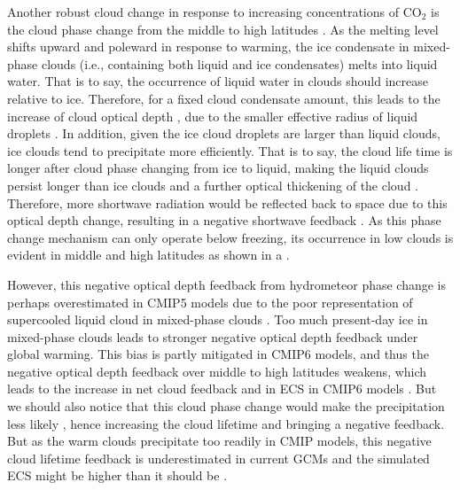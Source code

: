 Another robust cloud change in response to increasing concentrations of CO$_2$ is the cloud phase change from the middle to high latitudes \citep[e.g.,][]{Storelvmo2015cloud,Ceppi2016mechanisms,Tan2016observational,McCoy2016relationships}. As the melting level shifts upward and poleward in response to warming, the ice condensate in mixed-phase clouds (i.e., containing both liquid and ice condensates) melts into liquid water. That is to say, the occurrence of liquid water in clouds should increase relative to ice. Therefore, for a fixed cloud condensate amount, this leads to the increase of cloud optical depth \citep{Stephens1978radiation}, due to the smaller effective radius of liquid droplets \citep{Stubenrauch2013}. In addition, given the ice cloud droplets are larger than liquid clouds, ice clouds tend to precipitate more efficiently. That is to say, the cloud life time is longer after cloud phase changing from ice to liquid, making the liquid clouds persist longer than ice clouds and a further optical thickening of the cloud \citep{Storelvmo2015cloud,Ceppi2016mechanisms}. Therefore, more shortwave radiation would be reflected back to space due to this optical depth change, resulting in a negative shortwave feedback \citep[e.g.,][]{Zelinka2012computing1,Zelinka2012computing2,Zelinka2013contributions,Ceppi2016mechanisms,Tan2016observational,McCoy2016relationships,Zelinka2020causes,Bjordal2020equilibrium}. As this phase change mechanism can only operate below freezing, its occurrence in low clouds is evident in middle and high latitudes as shown in a \citep{Ceppi2017}. 


However, this negative optical depth feedback from hydrometeor phase change is perhaps overestimated in CMIP5 models due to the poor representation of supercooled liquid cloud in mixed-phase clouds \citep{Tan2016observational,Frey2018influence}. Too much present-day ice in mixed-phase clouds leads to stronger negative optical depth feedback under global warming. This bias is partly mitigated in CMIP6 models, and thus the negative optical depth feedback over middle to high latitudes weakens, which leads to the increase in net cloud feedback and in ECS in CMIP6 models \citep[e.g.,][]{Zelinka2020causes,Bjordal2020equilibrium}. But we should also notice that this cloud phase change would make the precipitation less likely \citep[e.g.,][]{Korolev2017mixed}, hence increasing the cloud lifetime and bringing a negative feedback. But as the warm clouds precipitate too readily in CMIP models, this negative cloud lifetime feedback is underestimated in current GCMs and the simulated ECS might be higher than it should be \citep{Mulmenstadt2021underestimated}.

